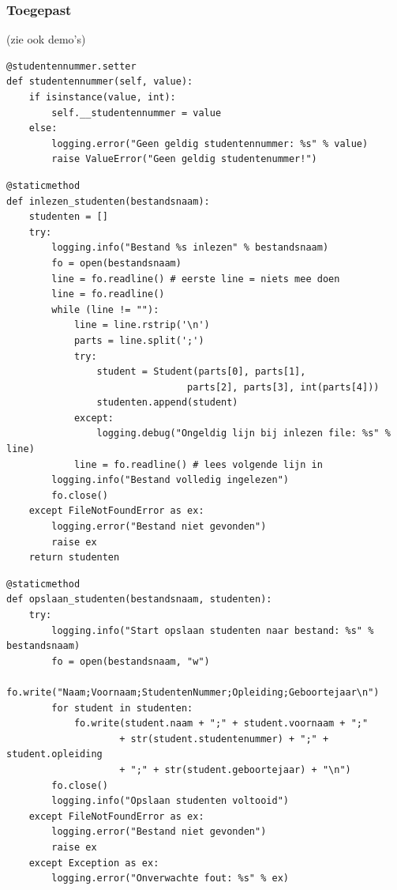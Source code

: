 \documentclass{article}
\begin{document}
\subsubsection{Toegepast}

(zie ook demo's)

\begin{verbatim}
@studentennummer.setter
def studentennummer(self, value):
    if isinstance(value, int):
        self.__studentennummer = value
    else:
        logging.error("Geen geldig studentennummer: %s" % value)
        raise ValueError("Geen geldig studentenummer!")
\end{verbatim}

\begin{verbatim}
@staticmethod
def inlezen_studenten(bestandsnaam):
    studenten = []
    try:
        logging.info("Bestand %s inlezen" % bestandsnaam)
        fo = open(bestandsnaam)
        line = fo.readline() # eerste line = niets mee doen
        line = fo.readline()
        while (line != ""):
            line = line.rstrip('\n')
            parts = line.split(';')
            try:
                student = Student(parts[0], parts[1], 
                                parts[2], parts[3], int(parts[4]))
                studenten.append(student)
            except:
                logging.debug("Ongeldig lijn bij inlezen file: %s" % line)
            line = fo.readline() # lees volgende lijn in
        logging.info("Bestand volledig ingelezen")
        fo.close()
    except FileNotFoundError as ex:
        logging.error("Bestand niet gevonden")
        raise ex
    return studenten
\end{verbatim}

\begin{verbatim}
@staticmethod
def opslaan_studenten(bestandsnaam, studenten):
    try:
        logging.info("Start opslaan studenten naar bestand: %s" % bestandsnaam)
        fo = open(bestandsnaam, "w")
        fo.write("Naam;Voornaam;StudentenNummer;Opleiding;Geboortejaar\n")
        for student in studenten:
            fo.write(student.naam + ";" + student.voornaam + ";" 
                    + str(student.studentenummer) + ";" + student.opleiding 
                    + ";" + str(student.geboortejaar) + "\n")
        fo.close()
        logging.info("Opslaan studenten voltooid")
    except FileNotFoundError as ex:
        logging.error("Bestand niet gevonden")
        raise ex
    except Exception as ex:
        logging.error("Onverwachte fout: %s" % ex)
\end{verbatim}
\end{document}
